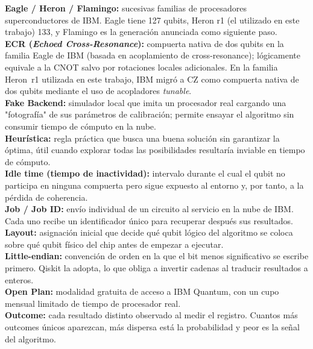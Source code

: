 \documentclass[12pt, spanish]{book}
\begin{document}
\textbf{Eagle / Heron / Flamingo:} sucesivas familias de procesadores superconductores de IBM. Eagle tiene 127 qubits, Heron r1 (el utilizado en este trabajo) 133, y Flamingo es la generación anunciada como siguiente paso.\\

\textbf{ECR (\textit{Echoed Cross-Resonance}):} compuerta nativa de dos qubits en la familia Eagle de IBM (basada en acoplamiento de cross-resonance); lógicamente equivale a la CNOT salvo por rotaciones locales adicionales. En la familia Heron~r1 utilizada en este trabajo, IBM migró a CZ como compuerta nativa de dos qubits mediante el uso de acopladores \textit{tunable}.\\

\textbf{Fake Backend:} simulador local que imita un procesador real cargando una "fotografía" de sus parámetros de calibración; permite ensayar el algoritmo sin consumir tiempo de cómputo en la nube.\\

\textbf{Heurística:} regla práctica que busca una buena solución sin garantizar la óptima, útil cuando explorar todas las posibilidades resultaría inviable en tiempo de cómputo.\\

\textbf{Idle time (tiempo de inactividad):} intervalo durante el cual el qubit no participa en ninguna compuerta pero sigue expuesto al entorno y, por tanto, a la pérdida de coherencia.\\

\textbf{Job / Job ID:} envío individual de un circuito al servicio en la nube de IBM. Cada uno recibe un identificador único para recuperar después sus resultados.\\

\textbf{Layout:} asignación inicial que decide qué qubit lógico del algoritmo se coloca sobre qué qubit físico del chip antes de empezar a ejecutar.\\

\textbf{Little-endian:} convención de orden en la que el bit menos significativo se escribe primero. Qiskit la adopta, lo que obliga a invertir cadenas al traducir resultados a enteros.\\

\textbf{Open Plan:} modalidad gratuita de acceso a IBM Quantum, con un cupo mensual limitado de tiempo de procesador real.\\

\textbf{Outcome:} cada resultado distinto observado al medir el registro. Cuantos más outcomes únicos aparezcan, más dispersa está la probabilidad y peor es la señal del algoritmo.\\
\end{document}
